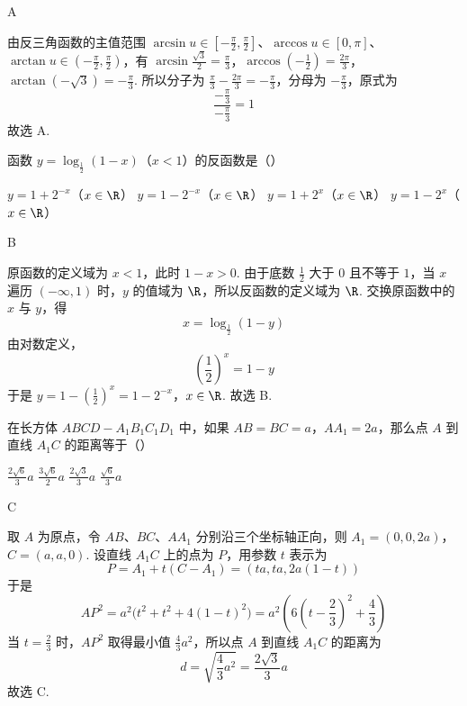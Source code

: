 \documentclass[UTF8,a4paper,oneside,11pt]{ctexbook}
\begin{document}
\begin{answer}
A
\end{answer}

\begin{solution}
由反三角函数的主值范围 \(\arcsin u\in[-\frac\pi2,\frac\pi2]\)、\(\arccos u\in[0,\pi]\)、\(\arctan u\in(-\frac\pi2,\frac\pi2)\)，有
\(\arcsin\frac{\sqrt{3}}2=\frac\pi3\)，\(\arccos\left(-\frac12\right)=\frac{2\pi}3\)，\(\arctan(-\sqrt{3})=-\frac\pi3\).
所以分子为 \(\frac\pi3-\frac{2\pi}3=-\frac\pi3\)，分母为 \(-\frac\pi3\)，原式为
\[
\frac{-\frac\pi3}{-\frac\pi3}=1
\]
故选 A.
\end{solution}

\begin{problem}
函数 \(y=\log_{\frac{1}{2}}(1-x)\)（\(x<1\)）的反函数是（\quad）

\choices
    {\(y=1+2^{-x}\)（\(x\in\R\)）}
    {\(y=1-2^{-x}\)（\(x\in\R\)）}
    {\(y=1+2^x\)（\(x\in\R\)）}
    {\(y=1-2^x\)（\(x\in\R\)）}
\end{problem}

\begin{answer}
B
\end{answer}

\begin{solution}
原函数的定义域为 \(x<1\)，此时 \(1-x>0\). 由于底数 \(\frac12\) 大于 \(0\) 且不等于 \(1\)，当 \(x\) 遍历 \((-\infty,1)\) 时，\(y\) 的值域为 \(\R\)，所以反函数的定义域为 \(\R\). 交换原函数中的 \(x\) 与 \(y\)，得
\[
x=\log_{\frac12}(1-y)
\]
由对数定义，
\[
\left(\frac12\right)^x=1-y
\]
于是
\(y=1-\left(\frac12\right)^x=1-2^{-x}\)，\(x\in\R\).
故选 B.
\end{solution}

\begin{problem}
在长方体 \(ABCD-A_1B_1C_1D_1\) 中，如果 \(AB=BC=a\)，\(AA_1=2a\)，那么点 \(A\) 到直线 \(A_1C\) 的距离等于（\quad）

\choices
    {\(\frac{2\sqrt{6}}{3}a\)}
    {\(\frac{3\sqrt{6}}{2}a\)}
    {\(\frac{2\sqrt{3}}{3}a\)}
    {\(\frac{\sqrt{6}}{3}a\)}
\end{problem}

\begin{answer}
C
\end{answer}

\begin{solution}
取 \(A\) 为原点，令 \(AB\)、\(BC\)、\(AA_1\) 分别沿三个坐标轴正向，则
\(A_1=(0,0,2a)\)，\(C=(a,a,0)\).
设直线 \(A_1C\) 上的点为 \(P\)，用参数 \(t\) 表示为
\[
P=A_1+t(C-A_1)=(ta,ta,2a(1-t))
\]
于是
\[
AP^2=a^2\bigl(t^2+t^2+4(1-t)^2\bigr)
=a^2\left(6\left(t-\frac23\right)^2+\frac43\right)
\]
当 \(t=\frac23\) 时，\(AP^2\) 取得最小值 \(\frac43a^2\)，所以点 \(A\) 到直线 \(A_1C\) 的距离为
\[
d=\sqrt{\frac43a^2}=\frac{2\sqrt{3}}3a
\]
故选 C.
\end{solution}
\end{document}
